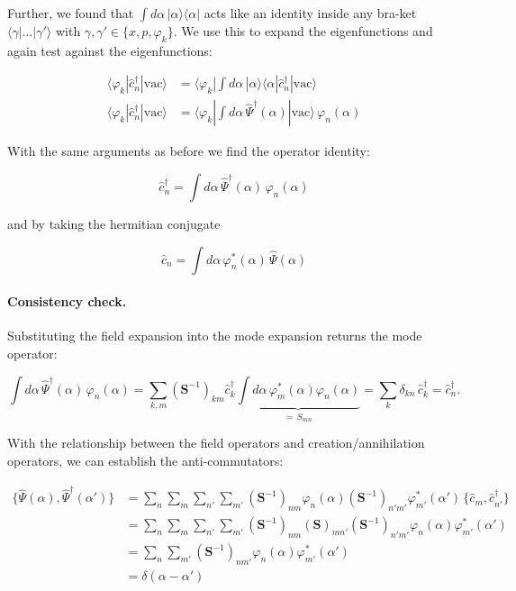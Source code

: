 Further, we found that $\int d\alpha\,|\alpha\rangle\langle\alpha|$ acts
like an identity inside any bra-ket $\langle\gamma|\dots|\gamma'\rangle$
with $\gamma,\gamma'\in\{x,p,\varphi_k\}$. We use this to expand the
eigenfunctions and again test against the eigenfunctions:

\begin{align}
\langle\varphi_k|\hat c_n^\dagger|\mathrm{vac}\rangle &= \langle\varphi_k|\int d\alpha\,|\alpha\rangle\langle\alpha|\hat c_n^\dagger|\mathrm{vac}\rangle\\
\langle\varphi_k|\hat c_n^\dagger|\mathrm{vac}\rangle &= \langle\varphi_k|\int d\alpha\,\hat\varPsi^\dagger(\alpha)|\mathrm{vac}\rangle\,\varphi_n(\alpha)
\end{align}

With the same arguments as before we find the operator identity:

\begin{equation}
\boxed{\hat c_n^\dagger = \int d\alpha\,\hat\varPsi^\dagger(\alpha)\,\varphi_n(\alpha)}
\end{equation}

and by taking the hermitian conjugate

\begin{equation}
\boxed{\hat c_n = \int d\alpha\,\varphi_n^*(\alpha)\,\hat\varPsi(\alpha)}
\end{equation}

\paragraph{Consistency check.} Substituting the field expansion into
the mode expansion returns the mode operator:

\begin{equation}
\int d\alpha\,\hat\varPsi^\dagger(\alpha)\,\varphi_n(\alpha)
= \sum_{k,m}\left(\mathbf S^{-1}\right)_{km}\hat c_k^\dagger
\underbrace{\int d\alpha\,\varphi_m^*(\alpha)\varphi_n(\alpha)}_{=\,S_{mn}}
= \sum_k \delta_{kn}\,\hat c_k^\dagger = \hat c_n^\dagger.
\end{equation}

With the relationship between the field operators and
creation/annihilation operators, we can establish the
anti-commutators:

\begin{align}
\{\hat\varPsi(\alpha),\hat\varPsi^\dagger(\alpha')\}
&= \sum_n\sum_m\sum_{n'}\sum_{m'}\left(\mathbf S^{-1}\right)_{nm}\varphi_n(\alpha)\left(\mathbf S^{-1}\right)_{n'm'}\varphi_{m'}^*(\alpha')\,\{\hat c_m,\hat c_{n'}^\dagger\}\\
&= \sum_n\sum_m\sum_{n'}\sum_{m'}\left(\mathbf S^{-1}\right)_{nm}\left(\mathbf S\right)_{mn'}\left(\mathbf S^{-1}\right)_{n'm'}\varphi_n(\alpha)\varphi_{m'}^*(\alpha')\\
&= \sum_n\sum_{m'}\left(\mathbf S^{-1}\right)_{nm'}\varphi_n(\alpha)\varphi_{m'}^*(\alpha')\\
&= \delta(\alpha-\alpha')
\end{align}

